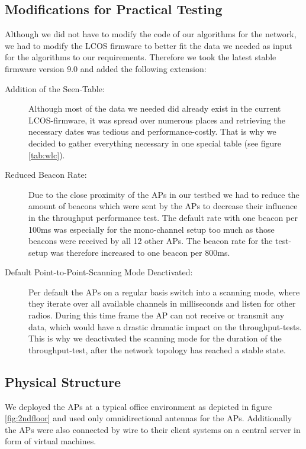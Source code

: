     \subsection{Modifications for Practical Testing}
      Although we did not have to modify the code of our algorithms for the network, we had to modify the \ac{LCOS} firmware to better fit the 
      data we needed as input for the algorithms to our requirements. Therefore we took the latest stable firmware version 9.0 and added the following extension:
      \begin{description}
	\item[Addition of the Seen-Table:]
	  Although most of the data we needed did already exist in the current \ac{LCOS}-firmware, it was spread over numerous places and retrieving the necessary dates
	  was tedious and performance-costly. That is why we decided to gather everything necessary in one special table (see figure \ref{tab:wlc}).
	\item[Reduced Beacon Rate:]
	  Due to the close proximity of the APs in our testbed we had to reduce the amount of beacons which were sent by the APs to decrease their influence in 
	  the throughput performance test. The default rate with one beacon per 100ms was especially for the mono-channel setup too much as those beacons were received
	  by all 12 other APs. The beacon rate for the test-setup was therefore increased to one beacon per 800ms.
	\item[Default Point-to-Point-Scanning Mode Deactivated:]
	  Per default the APs on a regular basis switch into a scanning mode, where they iterate over all available channels in milliseconds and listen for
	  other radios. During this time frame the AP can not receive or transmit any data, which would have a drastic dramatic impact on the throughput-tests.
	  This is why we deactivated the scanning mode for the duration of the throughput-test, after the network topology has reached a stable state.
      \end{description}
   
\newpage
   
    \subsection{Physical Structure}
      We deployed the APs at a typical office environment as depicted in figure \ref{fig:2ndfloor} and used only omnidirectional antennas for the APs.
      Additionally the APs were also connected by wire to their client systems on a central server in form of virtual machines.
      
